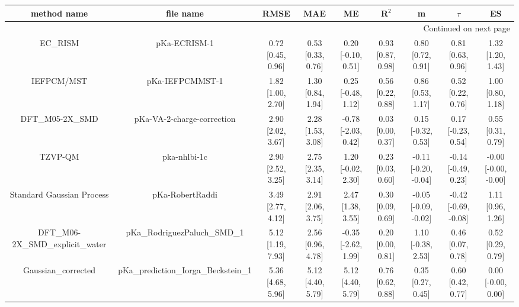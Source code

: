 \documentclass{article}
\begin{document}
\begin{center}
\scriptsize
\begin{longtable}{|ccccccccc|}
\toprule
                   method name &                             file name &               RMSE &                MAE &                   ME &              R$^2$ &                     m &                $\tau$ &                    ES \\
\midrule
\endhead
\midrule
\multicolumn{9}{r}{{Continued on next page}} \\
\midrule
\endfoot

\bottomrule
\endlastfoot
                       EC_RISM &                          pKa-ECRISM-1 &  0.72 [0.45, 0.96] &  0.53 [0.33, 0.76] &   0.20 [-0.10, 0.51] &  0.93 [0.87, 0.98] &     0.80 [0.72, 0.91] &     0.81 [0.63, 0.96] &     1.32 [1.20, 1.43] \\
                    IEFPCM/MST &                       pKa-IEFPCMMST-1 &  1.82 [1.00, 2.70] &  1.30 [0.84, 1.94] &   0.25 [-0.48, 1.12] &  0.56 [0.22, 0.88] &     0.86 [0.53, 1.17] &     0.52 [0.22, 0.76] &     1.00 [0.80, 1.18] \\
                DFT_M05-2X_SMD &            pKa-VA-2-charge-correction &  2.90 [2.02, 3.67] &  2.28 [1.53, 3.08] &  -0.78 [-2.03, 0.42] &  0.03 [0.00, 0.37] &    0.15 [-0.32, 0.53] &    0.17 [-0.23, 0.54] &     0.55 [0.31, 0.79] \\
                       TZVP-QM &                          pka-nhlbi-1c &  2.90 [2.52, 3.25] &  2.75 [2.35, 3.14] &   1.20 [-0.02, 2.30] &  0.23 [0.03, 0.60] &  -0.11 [-0.20, -0.04] &   -0.14 [-0.49, 0.23] &  -0.00 [-0.00, -0.00] \\
     Standard Gaussian Process &                       pKa-RobertRaddi &  3.49 [2.77, 4.12] &  2.91 [2.06, 3.75] &    2.47 [1.38, 3.55] &  0.30 [0.09, 0.69] &  -0.05 [-0.09, -0.02] &  -0.42 [-0.69, -0.08] &     1.11 [0.96, 1.26] \\
 DFT_M06-2X_SMD_explicit_water &          pKa\_RodriguezPaluch\_SMD\_1 &  5.12 [1.19, 7.93] &  2.56 [0.96, 4.78] &  -0.35 [-2.62, 1.99] &  0.20 [0.00, 0.81] &    1.10 [-0.38, 2.53] &     0.46 [0.07, 0.78] &     0.52 [0.29, 0.79] \\
            Gaussian_corrected &  pKa\_prediction\_Iorga\_Beckstein\_1 &  5.36 [4.68, 5.96] &  5.12 [4.40, 5.79] &    5.12 [4.40, 5.79] &  0.76 [0.62, 0.88] &     0.35 [0.27, 0.45] &     0.60 [0.42, 0.77] &    0.00 [-0.00, 0.00] \\
\end{longtable}
\end{center}
\end{document}
